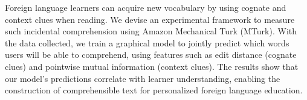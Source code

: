 Foreign language learners can acquire new vocabulary by using cognate and context clues when reading. We devise an experimental framework to measure such incidental comprehension using Amazon Mechanical Turk (MTurk). With the data collected, we train a graphical model to jointly predict which words users will be able to comprehend, using features such as edit distance (cognate clues) and pointwise mutual information (context clues). The results show that our model's predictions correlate with learner understanding, enabling the construction of comprehensible text for personalized foreign language education.
